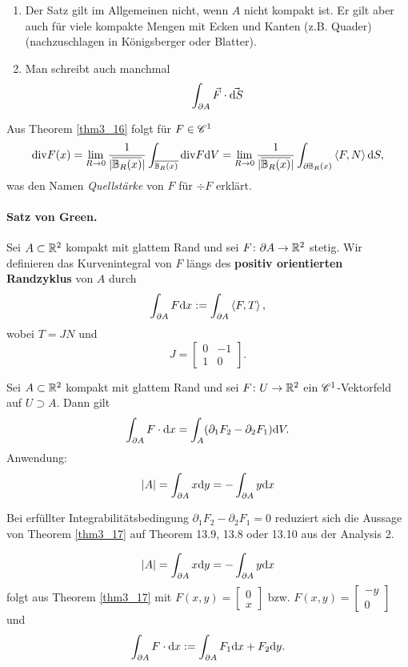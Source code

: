\begin{rem}
	\begin{enumerate}
		\item Der Satz gilt im Allgemeinen nicht, wenn $A$ nicht kompakt ist. Er gilt aber auch für viele kompakte Mengen mit Ecken und Kanten (z.B. Quader) (nachzuschlagen in Königsberger oder Blatter).
		\item Man schreibt auch manchmal
		\[\int_{\partial A} \vec{F} \cdot \vec{\mathrm{d} S}\]
	\end{enumerate}
\end{rem}
\begin{rem}
	Aus Theorem \ref{thm3_16} folgt für $F \in \mathscr{C}^1$
	\[\mathrm{div} F(x) = \lim_{R \to 0} \frac{1}{|\overline{\mathbb{B}_R(x)}|} \int_{\overline{\mathbb{B}_R(x)}} \mathrm{div} F \mathrm{d} V = \lim_{R \to 0} \frac{1}{|\overline{\mathbb{B}_R(x)}|} \int_{\partial \mathbb{B}_R(x)} \left\langle F,N \right\rangle \mathrm{d} S,\]
	was den Namen \textit{Quellstärke} von $F$ für $\div F$ erklärt.
\end{rem}
\paragraph{Satz von Green. } Sei $A \subset \mathbb{R}^2$ kompakt mit glattem Rand und sei $F \colon \partial A \to \mathbb{R}^2$ stetig. Wir definieren das Kurvenintegral von $F$ längs des \textbf{positiv orientierten Randzyklus} von $A$ durch
\[\int_{\partial A} F \mathrm{d} x := \int_{\partial A} \left\langle F,T \right\rangle,\]
wobei $T = JN$ und 
\[J = \begin{bmatrix}
	0 & -1\\
	1 & 0
\end{bmatrix}.\]
\begin{thm}\label{thm3_17}
	Sei $A \subset \mathbb{R}^2$ kompakt mit glattem Rand und sei $F \colon U \to \mathbb{R}^2$ ein $\mathscr{C}^1$-Vektorfeld auf $U \supset A$. Dann gilt
	\[\int_{\partial A} F \cdot \mathrm{d} x = \int_A (\partial_1 F_2 - \partial_2 F_1) \mathrm{d} V.\]
	Anwendung:
	\[|A| = \int_{\partial A} x \mathrm{d} y = - \int_{\partial A} y \mathrm{d} x\]
\end{thm}
\begin{rem}
	Bei erfüllter Integrabilitätsbedingung $\partial_1 F_2 - \partial_2 F_1 = 0$ reduziert sich die Aussage von Theorem \ref{thm3_17} auf Theorem 13.9, 13.8 oder 13.10 aus der Analysis 2.
\end{rem}
\begin{folgerung}
	
	\[|A| = \int_{\partial A} x \mathrm{d} y = - \int_{\partial A} y \mathrm{d} x\]
	folgt aus Theorem \ref{thm3_17} mit $F(x,y) = \begin{bmatrix}
		0\\
		x
	\end{bmatrix}$ bzw. $F(x,y) = \begin{bmatrix}
	-y\\
	0
	\end{bmatrix}$ und
	\[\int_{\partial A} F \cdot \mathrm{d} x := \int_{\partial A} F_1 \mathrm{d} x + F_2 \mathrm{d} y.\]
\end{folgerung}

